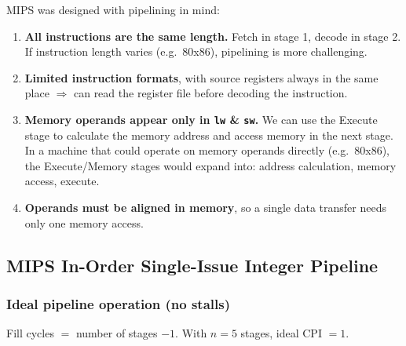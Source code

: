 MIPS was designed with pipelining in mind:
\begin{enumerate}
  \item \textbf{All instructions are the same length.} Fetch in stage 1,
  decode in stage 2. If instruction length varies (e.g.\ 80x86), pipelining
  is more challenging.
  \item \textbf{Limited instruction formats}, with source registers always in
  the same place $\Rightarrow$ can read the register file before decoding
  the instruction.
  \item \textbf{Memory operands appear only in \texttt{lw} \& \texttt{sw}.}
  We can use the Execute stage to calculate the memory address and access
  memory in the next stage. In a machine that could operate on memory
  operands directly (e.g.\ 80x86), the Execute/Memory stages would expand
  into: address calculation, memory access, execute.
  \item \textbf{Operands must be aligned in memory}, so a single data
  transfer needs only one memory access.
\end{enumerate}

\subsection{MIPS In-Order Single-Issue Integer Pipeline}

\subsubsection{Ideal pipeline operation (no stalls)}

Fill cycles $=$ number of stages $-1$. With $n=5$ stages, ideal CPI $=1$.

\begin{center}
\end{center}

